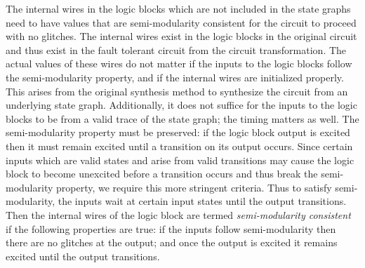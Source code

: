 \documentclass[12pt]{report}
\begin{document}
The internal wires in the logic blocks which are not included in the state graphs need to have values that are semi-modularity consistent for the circuit to proceed with no glitches.  The internal wires exist in the logic blocks in the original circuit and thus exist in the fault tolerant circuit from the circuit transformation.  The actual values of these wires do not matter if the inputs to the logic blocks follow the semi-modularity property, and if the internal wires are initialized properly.  This arises from the original synthesis method to synthesize the circuit from an underlying state graph.  
Additionally, it does not suffice for the inputs to the logic blocks to be from a valid trace of the state graph; the timing matters as well.  The semi-modularity property must be preserved:  if the logic block output is excited then it must remain excited until a transition on its output occurs.  Since certain inputs which are valid states and arise from valid transitions may cause the logic block to become unexcited before a transition occurs and thus break the semi-modularity property, we require this more stringent criteria.  %
Thus to satisfy semi-modularity, the inputs wait at certain input states until the output transitions.  Then the internal wires of the logic block are termed {\em semi-modularity consistent} if the following properties are true:  if the inputs follow semi-modularity then there are no glitches at the output; and once the output is excited it remains excited until the output transitions. \\%
\end{document}

